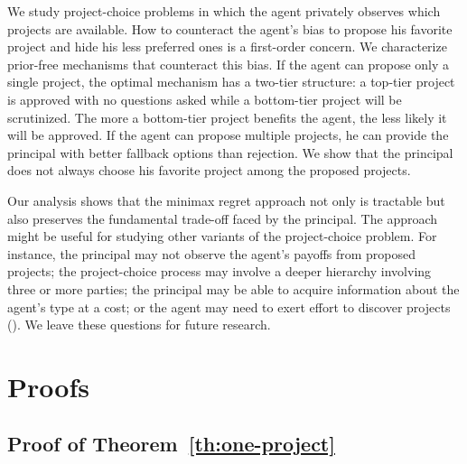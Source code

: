 \documentclass[12pt,english]{article}
\theoremstyle{remark}
\theoremstyle{plain}
\theoremstyle{definition}
\begin{document}
We study project-choice problems in which the agent privately observes which projects are available. How to counteract the agent's bias to propose his favorite project and hide his less preferred ones is a first-order concern. We characterize prior-free mechanisms that counteract this bias. If the agent can propose only a single project, the optimal mechanism has a two-tier structure: a top-tier project is approved with no questions asked while a bottom-tier project will be scrutinized. The more a bottom-tier project benefits the agent, the less likely it will be approved. If the agent can propose multiple projects, he can provide the principal with better fallback options than rejection. We show that the principal does not always choose his favorite project among the proposed projects.

Our analysis shows that the minimax regret approach not only is tractable but also preserves the fundamental trade-off faced by the principal. The approach might be useful for studying other variants of the project-choice problem. For instance, the principal may not observe the agent's payoffs from proposed projects; the project-choice process may involve a deeper hierarchy involving three or more parties; the principal may be able to acquire information about the agent's type at a cost; or the agent may need to exert effort to discover projects (\cite{ArmstrongVickers2010}). We leave these questions for future research. 
 

\section{Proofs}
\label{se:proofs}



    \subsection{Proof of Theorem~\ref{th:one-project}}
\end{document}
